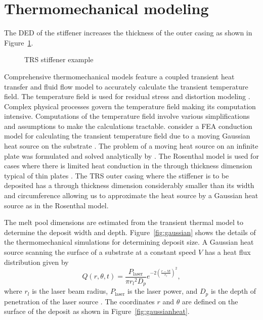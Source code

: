 \section{Thermomechanical modeling}
\label{sec:thermomech}

The \ac{DED} of the stiffener increases the thickness of the outer casing as shown in Figure~\ref{fig:TRSoverview}. 

\begin{figure}[h!]
	\centering
	 \hspace{0.1\textwidth}%
	\caption{TRS stiffener example}
	\label{fig:TRSoverview}
\end{figure}

Comprehensive thermomechanical models feature a coupled transient heat transfer and fluid flow model to accurately calculate the transient temperature field. The temperature field is used for residual stress and distortion modeling \cite{Mukherjee2017}. Complex physical processes govern the temperature field making its computation intensive. Computations of the temperature field involve various simplifications and assumptions to make the calculations tractable. \citeauthor{Manvatkar2011} consider a \ac{FEA} conduction model for calculating the transient temperature field due to a moving Gaussian heat source on the substrate \cite{Manvatkar2011}. The problem of a moving heat source on an infinite plate was formulated and solved analytically by \citeauthor{rosenthal1946theory} \cite{rosenthal1946theory}. The Rosenthal model is used for cases where there is limited heat conduction in the through thickness dimension typical of thin plates \cite{Goldak1984}. The \ac{TRS} outer casing where the stiffener is to be deposited has a through thickness dimension considerably smaller than its width and circumference allowing us to approximate the heat source by a Gaussian heat source as in the Rosenthal model.

The melt pool dimensions are estimated from the transient thermal model to determine the deposit width and depth. Figure~\ref{fig:gaussian} shows the details of the thermomechanical simulations for determining deposit size. A Gaussian heat source scanning the surface of a substrate at a constant speed ${V}$ has a heat flux distribution given by
%
\begin{equation}
	Q(r,\theta,t) = \dfrac{P_{\textrm{laser}}}{\pi{r_l}^2 D_p}e^{-2\left(\frac{r-{V}t}{r_l}\right)^2}, \label{eg:gaussian}
\end{equation}
%
where ${r_l}$ is the laser beam radius, $P_{\textrm{laser}}$ is the laser power, and $D_p$ is the depth of penetration of the laser source \cite{rosenthal1946theory}. The coordinates $r$ and $\theta$ are defined on the surface of the deposit as shown in Figure~\ref{fig:gaussianheat}. 

